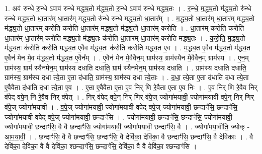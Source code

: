 \documentclass[17pt]{extarticle}
\begin{document}
1. अव॑ रुन्धे रु॒न्धे ऽवाव॑ रुन्धे मद्ध्य॒तो म॑द्ध्य॒तो रु॒न्धे ऽवाव॑ रुन्धे मद्ध्य॒तः । . रु॒न्धे॒ म॒द्ध्य॒तो म॑द्ध्य॒तो रु॑न्धे रुन्धे मद्ध्य॒तो धा॒तार॑म् धा॒तार॑म् मद्ध्य॒तो रु॑न्धे रुन्धे मद्ध्य॒तो धा॒तार᳚म् । . म॒द्ध्य॒तो धा॒तार॑म् धा॒तार॑म् मद्ध्य॒तो म॑द्ध्य॒तो धा॒तार॑म् करोति करोति धा॒तार॑म् मद्ध्य॒तो म॑द्ध्य॒तो धा॒तार॑म् करोति । . धा॒तार॑म् करोति करोति धा॒तार॑म् धा॒तार॑म् करोति मद्ध्य॒तो म॑द्ध्य॒तः क॑रोति धा॒तार॑म् धा॒तार॑म् करोति मद्ध्य॒तः । . क॒रो॒ति॒ म॒द्ध्य॒तो म॑द्ध्य॒तः क॑रोति करोति मद्ध्य॒त ए॒वैव म॑द्ध्य॒तः क॑रोति करोति मद्ध्य॒त ए॒व । . म॒द्ध्य॒त ए॒वैव म॑द्ध्य॒तो म॑द्ध्य॒त ए॒वैन॑ मेन मे॒व म॑द्ध्य॒तो म॑द्ध्य॒त ए॒वैन᳚म् । . ए॒वैन॑ मेन मे॒वैवैन॒म् ग्राम॑स्य॒ ग्राम॑स्यैन मे॒वैवैन॒म् ग्राम॑स्य । . ए॒न॒म् ग्राम॑स्य॒ ग्राम॑ स्यैनमेन॒म् ग्राम॑स्य दधाति दधाति॒ ग्राम॑ स्यैनमेन॒म् ग्राम॑स्य दधाति । . ग्राम॑स्य दधाति दधाति॒ ग्राम॑स्य॒ ग्राम॑स्य दधा त्ये॒ता ए॒ता द॑धाति॒ ग्राम॑स्य॒ ग्राम॑स्य दधा त्ये॒ताः । . द॒धा॒ त्ये॒ता ए॒ता द॑धाति दधा त्ये॒ता ए॒वैवैता द॑धाति दधा त्ये॒ता ए॒व । . ए॒ता ए॒वैवैता ए॒ता ए॒व निर् णि रे॒वैता ए॒ता ए॒व निः । . ए॒व निर् णि रे॒वैव निर् व॑पेद् वपे॒न् नि रे॒वैव निर् व॑पेत् । . निर् व॑पेद् वपे॒न् निर् णिर् व॑पे॒ज् ज्योगा॑मयावी॒ ज्योगा॑मयावी वपे॒न् निर् णिर् व॑पे॒ज् ज्योगा॑मयावी । . व॒पे॒ज् ज्योगा॑मयावी॒ ज्योगा॑मयावी वपेद् वपे॒ज् ज्योगा॑मयावी॒ छन्दाꣳ॑सि॒ छन्दाꣳ॑सि॒ ज्योगा॑मयावी वपेद् वपे॒ज् ज्योगा॑मयावी॒ छन्दाꣳ॑सि । . ज्योगा॑मयावी॒ छन्दाꣳ॑सि॒ छन्दाꣳ॑सि॒ ज्योगा॑मयावी॒ ज्योगा॑मयावी॒ छन्दाꣳ॑सि॒ वै वै छन्दाꣳ॑सि॒ ज्योगा॑मयावी॒ ज्योगा॑मयावी॒ छन्दाꣳ॑सि॒ वै । . ज्योगा॑मया॒वीति॒ ज्योक् - आ॒म॒या॒वी॒ । . छन्दाꣳ॑सि॒ वै वै छन्दाꣳ॑सि॒ छन्दाꣳ॑सि॒ वै देवि॑का॒ देवि॑का॒ वै छन्दाꣳ॑सि॒ छन्दाꣳ॑सि॒ वै देवि॑काः । . वै देवि॑का॒ देवि॑का॒ वै वै देवि॑का॒ श्छन्दाꣳ॑सि॒ छन्दाꣳ॑सि॒ देवि॑का॒ वै वै देवि॑का॒ श्छन्दाꣳ॑सि । \newline
\end{document}
